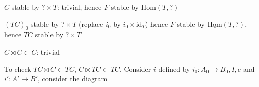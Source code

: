 
$C$ stable by $? \times T$: trivial, hence $F$ stable by $\underline{\mathrm{Hom}}(T,?)$

$(TC)_0$ stable by $?\times T$ (replace $i_0$ by $i_0\times\mathrm{id}_T$) hence $F$ stable by $\underline{\mathrm{Hom}}(T,?)$, hence $TC$ stable by $?\times T$


$C\boxtimes C\subset C$: trivial

To check $TC\boxtimes C\subset TC,\ C\boxtimes TC\subset TC$. Consider $i$ defined by $i_0\colon A_0\longrightarrow B_0,I,e$  and $i'\colon A'\longrightarrow B'$, consider the diagram


